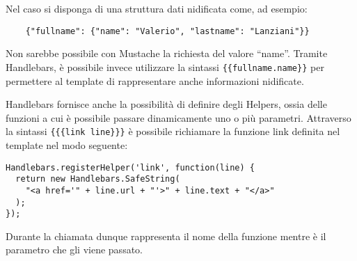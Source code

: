 Nel caso si disponga di una struttura dati nidificata come, ad esempio:
\begin{lstlisting}
    {"fullname": {"name": "Valerio", "lastname": "Lanziani"}}
\end{lstlisting}
Non sarebbe possibile con Mustache la richiesta del valore ``name''. Tramite Handlebars, è possibile invece utilizzare la sintassi \lstinline!{{fullname.name}}! per permettere al template di rappresentare anche informazioni nidificate.

Handlebars fornisce anche la possibilità di definire degli Helpers, ossia delle funzioni a cui è possibile passare dinamicamente uno o più parametri. Attraverso la sintassi \lstinline!{{{link line}}}! è possibile richiamare la funzione link definita nel template nel modo seguente:
\begin{lstlisting}
Handlebars.registerHelper('link', function(line) {
  return new Handlebars.SafeString(
    "<a href='" + line.url + "'>" + line.text + "</a>"
  );
});
\end{lstlisting}
Durante la chiamata dunque  rappresenta il nome della funzione mentre  è il parametro che gli viene passato.




